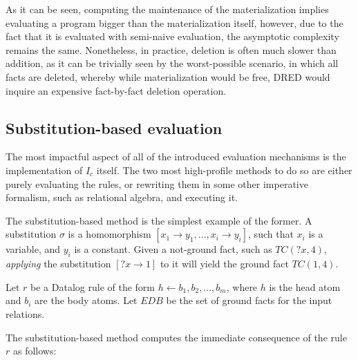\documentclass[sigconf,screen,review=false,natbib]{acmart}
\theoremstyle{definition}
\begin{document}
As it can be seen, computing the maintenance of the materialization implies evaluating a program bigger than the
materialization itself, however, due to the fact that it is evaluated with semi-naive evaluation, the asymptotic
complexity remains the same. Nonetheless, in practice, deletion is often much slower than addition, as it can be
trivially seen by the worst-possible scenario, in which all facts are deleted, whereby while materialization would
be free, DRED would inquire an expensive fact-by-fact deletion operation.
\subsection{Substitution-based evaluation}
The most impactful aspect of all of the introduced evaluation mechanisms is the implementation of $I_c$ itself. The two
most high-profile methods to do so are either purely evaluating the rules, or rewriting them in some other imperative
formalism, such as relational algebra, and executing it.

The substitution-based\cite{datalog} method is the simplest example of the former. A substitution $\sigma$ is
a homomorphism $[x_1 \rightarrow y_1, ..., x_i \rightarrow y_i]$, such that $x_i$ is a variable, and $y_i$ is
a constant. Given a not-ground fact, such as $TC(?x, 4)$, \textit{applying} the substitution $[?x \rightarrow 1]$ to
it will yield the ground fact $TC(1, 4)$.

Let $r$ be a Datalog rule of the form $h \leftarrow b_1, b_2, \ldots, b_m$, where $h$ is the head atom and $b_i$ are
the body atoms. Let $EDB$ be the set of ground facts for the input relations.

The substitution-based method computes the immediate consequence of the rule $r$ as follows:
\end{document}
